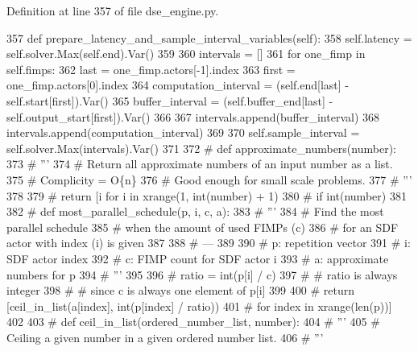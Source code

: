 Definition at line 357 of file dse\+\_\+engine.\+py.


\begin{DoxyCode}
357     \textcolor{keyword}{def }prepare\_latency\_and\_sample\_interval\_variables(self):
358         self.latency = self.solver.Max(self.end).Var()
359 
360         intervals = []
361         \textcolor{keywordflow}{for} one\_fimp \textcolor{keywordflow}{in} self.fimps:
362             last = one\_fimp.actors[-1].index
363             first = one\_fimp.actors[0].index
364             computation\_interval = (self.end[last] - self.start[first]).Var()
365             buffer\_interval = (self.buffer\_end[last] - self.output\_start[first]).Var()
366 
367             intervals.append(buffer\_interval)
368             intervals.append(computation\_interval)
369 
370         self.sample\_interval = self.solver.Max(intervals).Var()
371 
372 \textcolor{comment}{# def approximate\_numbers(number):}
373 \textcolor{comment}{#     '''}
374 \textcolor{comment}{#       Return all approximate numbers of an input number as a list.}
375 \textcolor{comment}{#       Complicity = O\{n\}}
376 \textcolor{comment}{#       Good enough for small scale problems.}
377 \textcolor{comment}{#     '''}
378 
379 \textcolor{comment}{#     return [i for i in xrange(1, int(number) + 1)}
380 \textcolor{comment}{#             if int(number) %
381 
382 \textcolor{comment}{# def most\_parallel\_schedule(p, i, c, a):}
383 \textcolor{comment}{#     '''}
384 \textcolor{comment}{#       Find the most parallel schedule}
385 \textcolor{comment}{#       when the amount of used FIMPs (c)}
386 \textcolor{comment}{#       for an SDF actor with index (i) is given}
387 
388 \textcolor{comment}{#       ---}
389 
390 \textcolor{comment}{#       p: repetition vector}
391 \textcolor{comment}{#       i: SDF actor index}
392 \textcolor{comment}{#       c: FIMP count for SDF actor i}
393 \textcolor{comment}{#       a: approximate numbers for p}
394 \textcolor{comment}{#     '''}
395 
396 \textcolor{comment}{#     ratio = int(p[i] / c)}
397 \textcolor{comment}{#     # ratio is always integer}
398 \textcolor{comment}{#     # since c is always one element of p[i]}
399 
400 \textcolor{comment}{#     return [ceil\_in\_list(a[index], int(p[index] / ratio))}
401 \textcolor{comment}{#             for index in xrange(len(p))]}
402 
403 \textcolor{comment}{# def ceil\_in\_list(ordered\_number\_list, number):}
404 \textcolor{comment}{#     '''}
405 \textcolor{comment}{#       Ceiling a given number in a given ordered number list.}
406 \textcolor{comment}{#     '''}
}
\end{DoxyCode}
